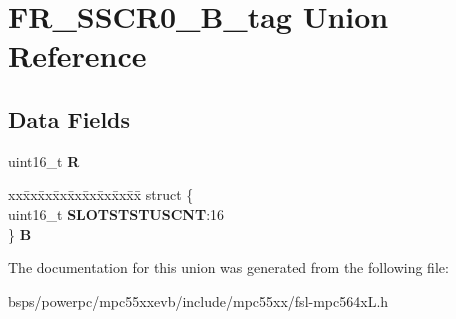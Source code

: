 \hypertarget{unionFR__SSCR0__16B__tag}{}\section{F\+R\+\_\+\+S\+S\+C\+R0\+\_\+B\+\_\+tag Union Reference}
\label{unionFR__SSCR0__16B__tag}
\subsection*{Data Fields}
\begin{DoxyCompactItemize}
\item 
\mbox{\label{unionFR__SSCR0__16B__tag_a28952ac205369850f4ca19b3319686ae}} 
uint16\+\_\+t {\bfseries R}
\item 
\mbox{\label{unionFR__SSCR0__16B__tag_af3114c54753c9856cb9a35b23c2fcf79}} 
\begin{tabbing}
xx\=xx\=xx\=xx\=xx\=xx\=xx\=xx\=xx\=\kill
struct \{\\
\>uint16\_t {\bfseries SLOTSTSTUSCNT}:16\\
\} {\bfseries B}\\

\end{tabbing}\end{DoxyCompactItemize}


The documentation for this union was generated from the following file\+:\begin{DoxyCompactItemize}
\item 
bsps/powerpc/mpc55xxevb/include/mpc55xx/fsl-\/mpc564x\+L.\+h\end{DoxyCompactItemize}
